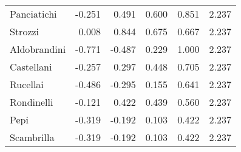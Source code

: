 \begin{table}
\begin{tabular}[t]{lrrrrr}
Panciatichi & -0.251 & 0.491 & 0.600 & 0.851 & 2.237\\
Strozzi & 0.008 & 0.844 & 0.675 & 0.667 & 2.237\\
Aldobrandini & -0.771 & -0.487 & 0.229 & 1.000 & 2.237\\
Castellani & -0.257 & 0.297 & 0.448 & 0.705 & 2.237\\
Rucellai & -0.486 & -0.295 & 0.155 & 0.641 & 2.237\\
Rondinelli & -0.121 & 0.422 & 0.439 & 0.560 & 2.237\\
Pepi & -0.319 & -0.192 & 0.103 & 0.422 & 2.237\\
Scambrilla & -0.319 & -0.192 & 0.103 & 0.422 & 2.237\\
\bottomrule
\end{tabular}
\end{table}
